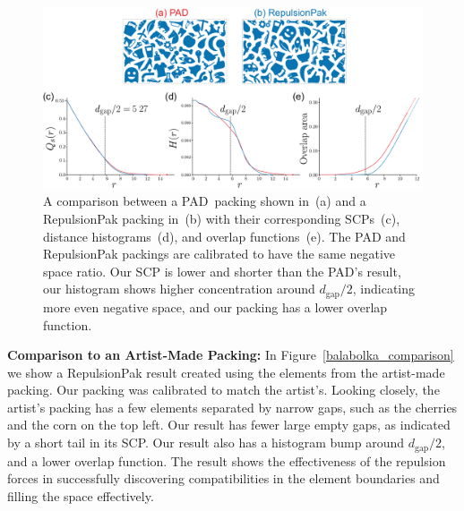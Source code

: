 \begin{figure}[t]
\centering
\includegraphics[width=1.0\textwidth]{figures/metrics/pad_comparison.pdf}
\caption[A comparison between a PAD~packing and a RepulsionPak packing \newline  with their corresponding SCPs]
{\label{pad_comparison}
    A comparison between a PAD~packing shown in~(a) and a RepulsionPak packing in~(b) 
    with their corresponding SCPs~(c), distance histograms~(d), and overlap functions~(e). 
  The PAD and RepulsionPak packings are calibrated
  to have the same negative space ratio.
    Our SCP is lower and shorter than the PAD's result,
    our histogram shows higher concentration around $d_\mathrm{gap} / 2$,
    indicating more even negative space,
    and our packing has a lower overlap function.
}
\end{figure}

\textbf{Comparison to an Artist-Made Packing:} 
In Figure~\ref{balabolka_comparison} we show a RepulsionPak result created 
using the elements from the artist-made packing.
Our packing was calibrated to match the artist's.
Looking closely, the artist's packing has a few elements 
separated by narrow gaps, such as the cherries and the corn on the top left.
Our result has fewer large empty gaps, as indicated by a short tail
in its SCP.
Our result also has a histogram bump around $d_\mathrm{gap}/2$, and a lower overlap function.
The result shows the effectiveness of the repulsion forces in successfully
discovering compatibilities in the element boundaries and filling the space effectively.

